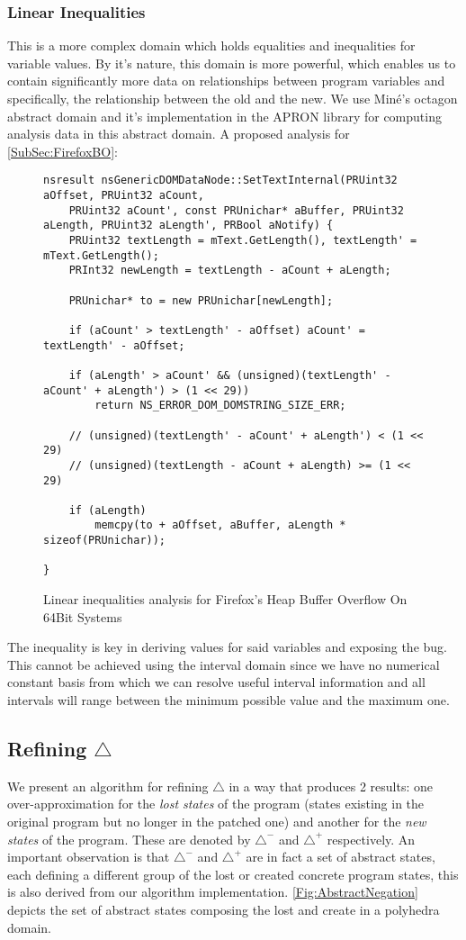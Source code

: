 \subsubsection{Linear Inequalities}
This is a more complex domain which holds equalities and inequalities for variable values. By it's nature, this domain is more powerful, which enables us to contain significantly more data on relationships between program variables and specifically, the relationship between the old and the new.
We use Min\'{e}'s octagon abstract domain \cite{Octagon} and it's implementation in the APRON library for computing analysis data in this abstract domain.
A proposed analysis for \ref{SubSec:FirefoxBO}:
\begin{figure}[H]
\begin{lstlisting}
nsresult nsGenericDOMDataNode::SetTextInternal(PRUint32 aOffset, PRUint32 aCount,
    PRUint32 aCount', const PRUnichar* aBuffer, PRUint32 aLength, PRUint32 aLength', PRBool aNotify) {
    PRUint32 textLength = mText.GetLength(), textLength' = mText.GetLength();
    PRInt32 newLength = textLength - aCount + aLength;

    PRUnichar* to = new PRUnichar[newLength];

    if (aCount' > textLength' - aOffset) aCount' = textLength' - aOffset;

    if (aLength' > aCount' && (unsigned)(textLength' - aCount' + aLength') > (1 << 29))
        return NS_ERROR_DOM_DOMSTRING_SIZE_ERR;

    // (unsigned)(textLength' - aCount' + aLength') < (1 << 29)
    // (unsigned)(textLength - aCount + aLength) >= (1 << 29)

    if (aLength)
        memcpy(to + aOffset, aBuffer, aLength * sizeof(PRUnichar));

}
\end{lstlisting}\caption{Linear inequalities analysis for Firefox's Heap Buffer Overflow On 64Bit Systems}
\end{figure}
The inequality  is key in deriving values for said variables and exposing the bug. This cannot be achieved using the interval domain since we have no numerical constant basis from which we can resolve useful interval information and all intervals will range between the minimum possible value and the maximum one.


\subsection{Refining $\triangle$}
We present an algorithm for refining $\triangle$ in a way that produces 2 results: one over-approximation for the \emph{lost states} of the program (states existing in the original program but no longer in the patched one) and another for the \emph{new states} of the program. These are denoted by $\triangle^-$ and $\triangle^+$ respectively. An important observation is that $\triangle^-$ and $\triangle^+$ are in fact a set of abstract states, each defining a different group of the lost or created concrete program states, this is also derived from our algorithm implementation. \ref{Fig:AbstractNegation} depicts the set of abstract states composing the lost and create in a polyhedra domain.

